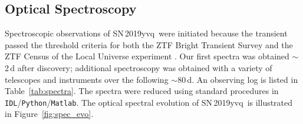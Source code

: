 \documentclass[twocolumn]{aastex63}
\newcommand{\sn}{SN\,2019yvq}
\begin{document}
% 
%
%

\subsection{Optical Spectroscopy}

Spectroscopic observations of \sn\ were initiated because the transient passed
the threshold criteria for both the ZTF Bright Transient Survey
\citep{Fremling19a} and the ZTF Census of the Local Universe experiment
\citep{De20}. Our first spectra was obtained $\sim$2\,d after discovery;
additional spectroscopy was obtained with a variety of telescopes and
instruments over the following $\sim$80\,d. An observing log is listed in
Table~\ref{tab:spectra}. The spectra were reduced using standard procedures in
\texttt{IDL}/\texttt{Python}/\texttt{Matlab}. The optical spectral evolution
of \sn\ is illustrated in Figure~\ref{fig:spec_evo}.
\end{document}
